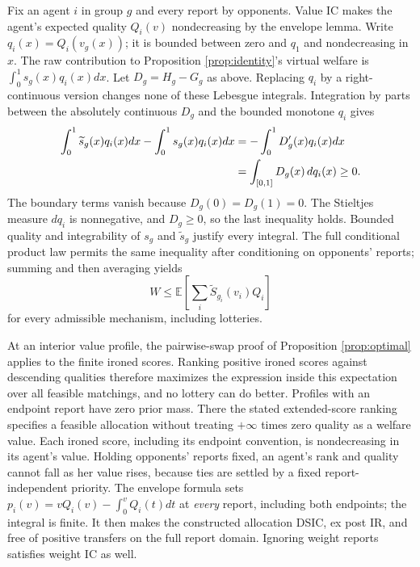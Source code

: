 \documentclass[11pt]{article}
\newcommand{\E}{\mathbb E}
\begin{document}
Fix an agent $i$ in group $g$ and every report by opponents. Value IC makes the agent's expected quality $Q_i(v)$ nondecreasing by the envelope lemma. Write $q_i(x)=Q_i(v_g(x))$; it is bounded between zero and $q_1$ and nondecreasing in $x$. The raw contribution to Proposition \ref{prop:identity}'s virtual welfare is $\int_0^1s_g(x)q_i(x)dx$. Let $D_g=H_g-G_g$ as above. Replacing $q_i$ by a right-continuous version changes none of these Lebesgue integrals. Integration by parts between the absolutely continuous $D_g$ and the bounded monotone $q_i$ gives
\begin{align}\label{eq:ironinginequality}
\int_0^1\widetilde s_g(x)q_i(x)dx
-\int_0^1s_g(x)q_i(x)dx
&=-\int_0^1D_g'(x)q_i(x)dx\notag\\
&=\int_{[0,1]}D_g(x)\,dq_i(x)\ge0.
\end{align}
The boundary terms vanish because $D_g(0)=D_g(1)=0$. The Stieltjes measure $dq_i$ is nonnegative, and $D_g\ge0$, so the last inequality holds. Bounded quality and integrability of $s_g$ and $\widetilde s_g$ justify every integral. The full conditional product law permits the same inequality after conditioning on opponents' reports; summing and then averaging yields
\[
W\le\E\!\left[\sum_i\widetilde S_{g_i}(v_i)Q_i\right]
\]
for every admissible mechanism, including lotteries.

At an interior value profile, the pairwise-swap proof of Proposition \ref{prop:optimal} applies to the finite ironed scores. Ranking positive ironed scores against descending qualities therefore maximizes the expression inside this expectation over all feasible matchings, and no lottery can do better. Profiles with an endpoint report have zero prior mass. There the stated extended-score ranking specifies a feasible allocation without treating $+\infty$ times zero quality as a welfare value. Each ironed score, including its endpoint convention, is nondecreasing in its agent's value. Holding opponents' reports fixed, an agent's rank and quality cannot fall as her value rises, because ties are settled by a fixed report-independent priority. The envelope formula sets $p_i(v)=vQ_i(v)-\int_0^vQ_i(t)dt$ at \emph{every} report, including both endpoints; the integral is finite. It then makes the constructed allocation DSIC, ex post IR, and free of positive transfers on the full report domain. Ignoring weight reports satisfies weight IC as well.
\end{document}
